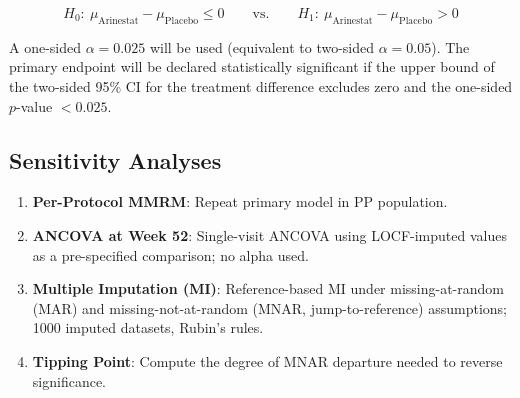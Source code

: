 \[
  H_0{:}\ \mu_{\text{Arinestat}} - \mu_{\text{Placebo}} \leq 0
  \qquad\text{vs.}\qquad
  H_1{:}\ \mu_{\text{Arinestat}} - \mu_{\text{Placebo}} > 0
\]

A one-sided $\alpha = 0.025$ will be used (equivalent to two-sided $\alpha = 0.05$).
The primary endpoint will be declared statistically significant if the upper bound of
the two-sided 95\% CI for the treatment difference excludes zero and the one-sided
$p$-value $< 0.025$.

\subsection{Sensitivity Analyses}

\begin{enumerate}[leftmargin=1.8em, label=\textbf{S\arabic*.}, itemsep=4pt]
  \item \textbf{Per-Protocol MMRM}: Repeat primary model in PP population.
  \item \textbf{ANCOVA at Week 52}: Single-visit ANCOVA using LOCF-imputed values as a
        pre-specified comparison; no alpha used.
  \item \textbf{Multiple Imputation (MI)}: Reference-based MI under missing-at-random (MAR)
        and missing-not-at-random (MNAR, jump-to-reference) assumptions; 1000 imputed
        datasets, Rubin's rules.
  \item \textbf{Tipping Point}: Compute the degree of MNAR departure needed to reverse
        significance.
\end{enumerate}

\clearpage

